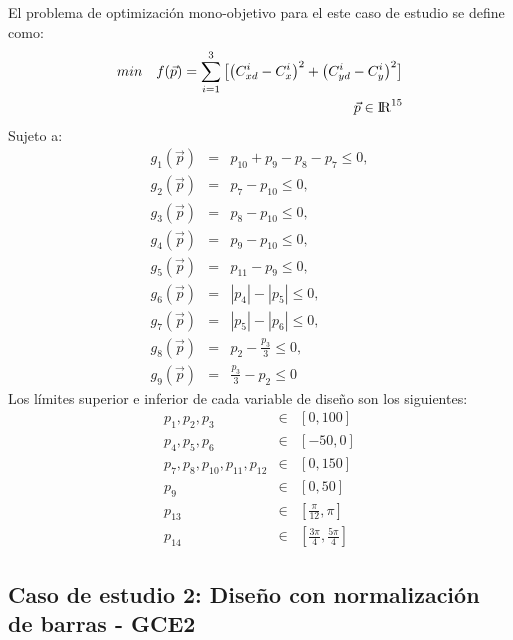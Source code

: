 El problema de optimización mono-objetivo para el este caso de estudio se define como:
 \begin{equation}\label{eq:gripper_FO1}
 \begin{aligned}
min\quad  f(\vec{p})=
\sum_{i=1}^{3}\big[\big(C^{i}_{xd}-C^{i}_{x} \big)^2 +\big(C^{i}_{yd}-C^{i}_{y} \big)^2\big]
\\
\vec{p} \in  {\rm I\!R}^{15}
\\
\end{aligned}
\end{equation}
Sujeto a:
\begin{eqnarray}\label{eq:Restricciones gripper1}
g_{1}(\vec{p})&=&p_{10}+ p_{9}-p_{8}-p_{7} \leq 0,\\
g_{2}(\vec{p})&=&p_{7}-p_{10} \leq 0,\\
g_{3}(\vec{p})&=&p_{8}-p_{10} \leq 0,\\
g_{4}(\vec{p})&=&p_{9}-p_{10} \leq 0,\\
g_{5}(\vec{p})&=&p_{11}-p_{9} \leq 0,\\
g_{6}(\vec{p})&=&|p_{4}|-|p_{5}| \leq 0,\\
g_{7}(\vec{p})&=&|p_{5}|-|p_{6}| \leq 0,\\
g_{8}(\vec{p})&=&p_{2}-\frac{p_3}{3} \leq 0,\\
g_{9}(\vec{p})&=&\frac{p_3}{3}-p_{2} \leq 0
\end{eqnarray}
Los límites superior e inferior de cada variable de diseño son los siguientes:
\begin{eqnarray}\label{eq:limites variables griper1}
p_1,p_2,p_3 & \in & \left[ 0,100\right] \\
p_4,p_5,p_6 & \in & \left[ -50,0\right] \\
p_7,p_8,p_{10},p_{11},p_{12} & \in & \left[ 0,150 \right] \\
p_9 & \in & \left[ 0,50\right] \\
p_{13} & \in & \left[ \frac{\pi}{12},\pi \right] \\
p_{14} & \in & \left[ \frac{3\pi}{4},\frac{5\pi}{4} \right]
\end{eqnarray}
\subsection{Caso de estudio 2: Diseño con normalización de barras - GCE2}

